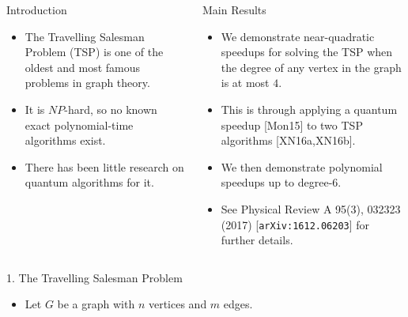 \documentclass[]{templates/poster}
\begin{document}

\begin{frame}{} 

\begin{columns}[t]
  \begin{column}{0.422\linewidth}
  \begin{block}{\Large Introduction}
  \begin{itemize}
  \item The Travelling Salesman Problem (TSP) is one of the oldest and most famous problems in graph theory.

  \item It is $NP$-hard, so no known exact polynomial-time algorithms exist.
  
  \item There has been little research on quantum algorithms for it.
  \end{itemize}
  \end{block}
  \end{column}
  \begin{column}{0.422\linewidth}

  \begin{block}{\Large Main Results}
  \begin{itemize}
  \item We demonstrate near-quadratic speedups for solving the TSP when the degree of any vertex in the graph is at most $4$.
  
  \item This is through applying a quantum speedup [Mon15] to two TSP algorithms [XN16a,XN16b].
  
  \item We then demonstrate polynomial speedups up to degree-6.
  
  \item See Physical Review A 95(3), 032323 (2017) [{\tt arXiv:1612.06203}] for further details.
  \end{itemize}
  \end{block}
  \end{column}
\end{columns}

\begin{columns}[t]
  \begin{column}{0.422\linewidth}
  \begin{block}{\Large 1. The Travelling Salesman Problem}
  \begin{itemize}
  \item Let $G$ be a graph with $n$ vertices and $m$ edges.
  

\end{itemize}
\end{block}
\end{column}
\end{columns}
\end{frame}
\end{document}
